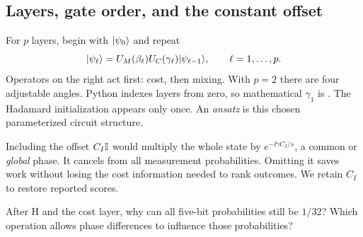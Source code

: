 \subsection{Layers, gate order, and the constant offset}
For $p$ layers, begin with $\lvert \psi_0\rangle$ and repeat
\begin{equation}\label{eq:qaoa-recursion}
\lvert \psi_\ell\rangle=U_M(\beta_\ell)U_C(\gamma_\ell)\lvert \psi_{\ell-1}\rangle,
\qquad \ell=1,\ldots,p.
\end{equation}
Operators on the right act first: cost, then mixing. With $p=2$ there are four
adjustable angles. Python indexes layers from zero, so mathematical
$\gamma_1$ is . The Hadamard initialization appears only once.
An \emph{ansatz} is this chosen parameterized circuit structure.

Including the offset $C_I\mathbb{I}$ would multiply the whole state by
$e^{-\ii\gamma C_I/s}$, a common or \emph{global} phase. It cancels from all
measurement probabilities. Omitting it saves work without losing the cost
information needed to rank outcomes. We retain $C_I$ to restore reported scores.

\begin{checkpoint}
After H and the cost layer, why can all five-bit probabilities still be $1/32$?
Which operation allows phase differences to influence those probabilities?
\end{checkpoint}
